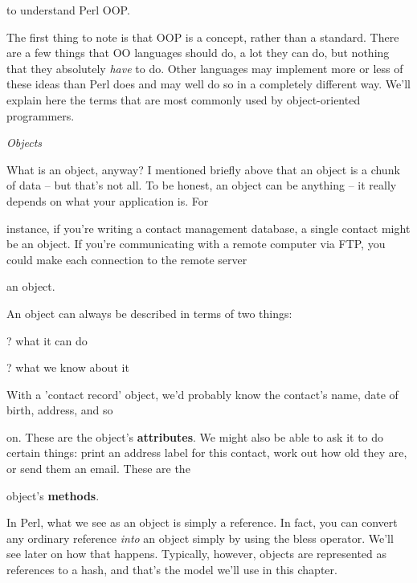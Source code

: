 \documentclass[a4paper,11pt]{book}
\begin{document}
\noindent to understand Perl OOP.

\noindent 

\noindent The first thing to note is that OOP is a concept, rather than a standard. There are a few things that OO languages should do, a lot they can do, but nothing that they absolutely \textit{have }to do. Other languages may implement more or less of these ideas than Perl does and may well do so in a completely different way. We'll explain here the terms that are most commonly used by object-oriented programmers.

\noindent 

\noindent \textit{Objects}

\noindent What is an object, anyway? I mentioned briefly above that an object is a chunk of data -- but that's not all. To be honest, an object can be anything -- it really depends on what your application is. For

\noindent instance, if you're writing a contact management database, a single contact might be an object. If you're communicating with a remote computer via FTP, you could make each connection to the remote server

\noindent an object.

\noindent 

\noindent An object can always be described in terms of two things:

\noindent 

\noindent ? what it can do

\noindent 

\noindent ? what we know about it

\noindent 

\noindent With a 'contact  record' object,  we'd  probably  know  the  contact's  name,  date  of  birth,  address,  and  so

\noindent on.  These are the object's \textbf{attributes}.  We might  also  be  able  to  ask it  to  do  certain  things:  print  an address  label for this contact,  work  out  how  old  they  are,  or  send  them  an  email.  These  are the

\noindent object's \textbf{methods}.

\noindent 

\noindent In Perl, what we see as an object is simply a reference. In fact, you can convert any ordinary reference \textit{into }an object simply by using the bless operator. We'll see later on how that happens. Typically, however, objects are represented as references to a hash, and that's the model we'll use in this chapter.
\end{document}
